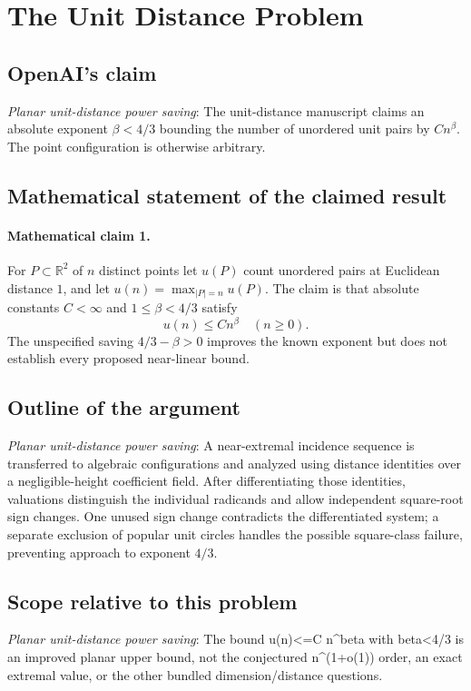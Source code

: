\documentclass[11pt]{article}
\begin{document}
\section*{The Unit Distance Problem}

\subsection{OpenAI's claim}
\textit{Planar unit-distance power saving}: The unit-distance manuscript claims an absolute exponent $\beta<4/3$ bounding the number of unordered unit pairs by $C n^\beta$. The point configuration is otherwise arbitrary.

\subsection{Mathematical statement of the claimed result}
\paragraph{Mathematical claim 1.} For $P\subset\mathbb R^2$ of $n$ distinct points let $u(P)$ count unordered pairs at Euclidean distance $1$, and let $u(n)=\max_{|P|=n}u(P)$. The claim is that absolute constants $C<\infty$ and $1\le\beta<4/3$ satisfy \[u(n)\le Cn^\beta\quad(n\ge0).\] The unspecified saving $4/3-\beta>0$ improves the known exponent but does not establish every proposed near-linear bound.

\subsection{Outline of the argument}
\textit{Planar unit-distance power saving}: A near-extremal incidence sequence is transferred to algebraic configurations and analyzed using distance identities over a negligible-height coefficient field. After differentiating those identities, valuations distinguish the individual radicands and allow independent square-root sign changes. One unused sign change contradicts the differentiated system; a separate exclusion of popular unit circles handles the possible square-class failure, preventing approach to exponent $4/3$.

\subsection{Scope relative to this problem}
\textit{Planar unit-distance power saving}: The bound u(n)<=C n\textasciicircum{}beta with beta<4/3 is an improved planar upper bound, not the conjectured n\textasciicircum{}(1+o(1)) order, an exact extremal value, or the other bundled dimension/distance questions.
\end{document}
